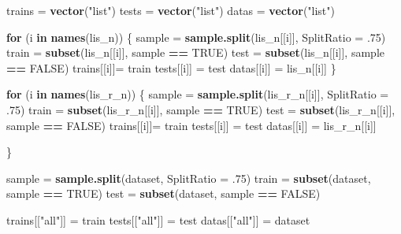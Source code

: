 \documentclass[
]{article}
\newenvironment{Shaded}{\begin{snugshade}}{\end{snugshade}}
\newcommand{\ControlFlowTok}[1]{\textcolor[rgb]{0.13,0.29,0.53}{\textbf{#1}}}
\newcommand{\DataTypeTok}[1]{\textcolor[rgb]{0.13,0.29,0.53}{#1}}
\newcommand{\FloatTok}[1]{\textcolor[rgb]{0.00,0.00,0.81}{#1}}
\newcommand{\KeywordTok}[1]{\textcolor[rgb]{0.13,0.29,0.53}{\textbf{#1}}}
\newcommand{\NormalTok}[1]{#1}
\newcommand{\OperatorTok}[1]{\textcolor[rgb]{0.81,0.36,0.00}{\textbf{#1}}}
\newcommand{\OtherTok}[1]{\textcolor[rgb]{0.56,0.35,0.01}{#1}}
\newcommand{\StringTok}[1]{\textcolor[rgb]{0.31,0.60,0.02}{#1}}
\begin{document}
\begin{Shaded}
\begin{Highlighting}[]
\NormalTok{trains =}\StringTok{ }\KeywordTok{vector}\NormalTok{(}\StringTok{"list"}\NormalTok{)}
\NormalTok{tests =}\StringTok{ }\KeywordTok{vector}\NormalTok{(}\StringTok{"list"}\NormalTok{)}
\NormalTok{datas =}\StringTok{ }\KeywordTok{vector}\NormalTok{(}\StringTok{"list"}\NormalTok{)}

\ControlFlowTok{for}\NormalTok{ (i }\ControlFlowTok{in} \KeywordTok{names}\NormalTok{(lis_n))}
\NormalTok{\{}
\NormalTok{  sample =}\StringTok{ }\KeywordTok{sample.split}\NormalTok{(lis_n[[i]], }\DataTypeTok{SplitRatio =} \FloatTok{.75}\NormalTok{)}
\NormalTok{  train =}\StringTok{ }\KeywordTok{subset}\NormalTok{(lis_n[[i]], sample }\OperatorTok{==}\StringTok{ }\OtherTok{TRUE}\NormalTok{)}
\NormalTok{  test  =}\StringTok{ }\KeywordTok{subset}\NormalTok{(lis_n[[i]], sample }\OperatorTok{==}\StringTok{ }\OtherTok{FALSE}\NormalTok{)}
\NormalTok{  trains[[i]]=}\StringTok{  }\NormalTok{train}
\NormalTok{  tests[[i]] =}\StringTok{ }\NormalTok{test}
\NormalTok{  datas[[i]] =}\StringTok{ }\NormalTok{lis_n[[i]]}
\NormalTok{\}}

\ControlFlowTok{for}\NormalTok{ (i }\ControlFlowTok{in} \KeywordTok{names}\NormalTok{(lis_r_n))}
\NormalTok{\{}
\NormalTok{  sample =}\StringTok{ }\KeywordTok{sample.split}\NormalTok{(lis_r_n[[i]], }\DataTypeTok{SplitRatio =} \FloatTok{.75}\NormalTok{)}
\NormalTok{  train =}\StringTok{ }\KeywordTok{subset}\NormalTok{(lis_r_n[[i]], sample }\OperatorTok{==}\StringTok{ }\OtherTok{TRUE}\NormalTok{)}
\NormalTok{  test  =}\StringTok{ }\KeywordTok{subset}\NormalTok{(lis_r_n[[i]], sample }\OperatorTok{==}\StringTok{ }\OtherTok{FALSE}\NormalTok{)}
\NormalTok{  trains[[i]]=}\StringTok{  }\NormalTok{train}
\NormalTok{  tests[[i]] =}\StringTok{ }\NormalTok{test}
\NormalTok{  datas[[i]] =}\StringTok{ }\NormalTok{lis_r_n[[i]]}
  
\NormalTok{\}}

\NormalTok{sample =}\StringTok{ }\KeywordTok{sample.split}\NormalTok{(dataset, }\DataTypeTok{SplitRatio =} \FloatTok{.75}\NormalTok{)}
\NormalTok{train =}\StringTok{ }\KeywordTok{subset}\NormalTok{(dataset, sample }\OperatorTok{==}\StringTok{ }\OtherTok{TRUE}\NormalTok{)}
\NormalTok{test  =}\StringTok{ }\KeywordTok{subset}\NormalTok{(dataset, sample }\OperatorTok{==}\StringTok{ }\OtherTok{FALSE}\NormalTok{)}

\NormalTok{trains[[}\StringTok{"all"}\NormalTok{]] =}\StringTok{ }\NormalTok{train}
\NormalTok{tests[[}\StringTok{"all"}\NormalTok{]] =}\StringTok{ }\NormalTok{test}
\NormalTok{datas[[}\StringTok{"all"}\NormalTok{]] =}\StringTok{ }\NormalTok{dataset}
\end{Highlighting}
\end{Shaded}
\end{document}
